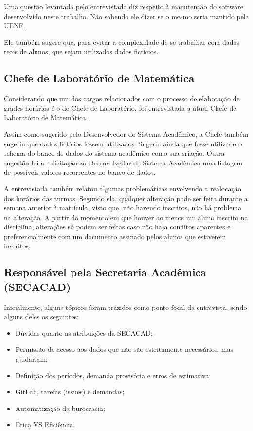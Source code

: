 Uma questão levantada pelo entrevistado diz respeito à manutenção do software desenvolvido neste trabalho. Não sabendo ele dizer se o mesmo seria mantido pela UENF.

Ele também sugere que, para evitar a complexidade de se trabalhar com dados reais de alunos, que sejam utilizados dados fictícios.

\subsection{Chefe de Laboratório de Matemática} %

Considerando que um dos cargos relacionados com o processo de elaboração de grades horários é o de Chefe de Laboratório, foi entrevistada a atual Chefe de Laboratório de Matemática.

Assim como sugerido pelo Desenvolvedor do Sistema Acadêmico, a Chefe também sugeriu que dados fictícios fossem utilizados. Sugeriu ainda que fosse utilizado o schema do banco de dados do sistema acadêmico como sua criação. Outra sugestão foi a solicitação ao Desenvolvedor do Sistema Acadêmico uma listagem de possíveis valores recorrentes no banco de dados.

A entrevistada também relatou algumas problemáticas envolvendo a realocação dos horários das turmas. Segundo ela, qualquer alteração pode ser feita durante a semana anterior à matrícula, visto que, não havendo inscritos, não há problema na alteração. A partir do momento em que houver ao menos um aluno inscrito na disciplina, alterações só podem ser feitas caso não haja conflitos aparentes e preferencialmente com um documento assinado pelos alunos que estiverem inscritos.

\subsection{Responsável pela Secretaria Acadêmica (SECACAD)} %

Inicialmente, alguns tópicos foram trazidos como ponto focal da entrevista, sendo alguns deles os seguintes:

\begin{itemize}
  \item Dúvidas quanto as atribuições da SECACAD;
  \item Permissão de acesso aos dados que não são estritamente necessários, mas ajudariam;
  \item Definição dos períodos, demanda provisória e erros de estimativa;
  \item GitLab, tarefas (issues) e demandas;
  \item Automatização da burocracia;
  \item Ética VS Eficiência.
\end{itemize}

